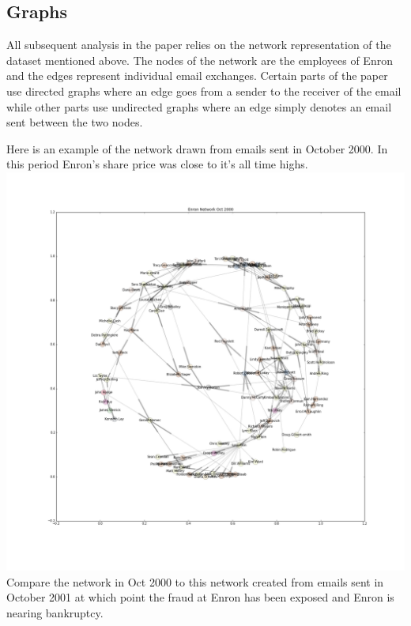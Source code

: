 \documentclass[12pt]{article}
\begin{document}
	\subsection{Graphs}
	All subsequent analysis in the paper relies on the network representation of the dataset mentioned above. The nodes of the network are the employees of Enron and the edges represent individual email exchanges. Certain parts of the paper use directed graphs where an edge goes from a sender to the receiver of the email while other parts use undirected graphs where an edge simply denotes an email sent between the two nodes.
	\par
	Here is an example of the network drawn from emails sent in October 2000. In this period Enron's share price was close to it's all time highs. \\
	\includegraphics[width=1\textwidth]{figureEnronOct2000}
	\\
	Compare the network in Oct 2000 to this network created from emails sent in October 2001 at which point the fraud at Enron has been exposed and Enron is nearing bankruptcy.
	\\
\end{document}
